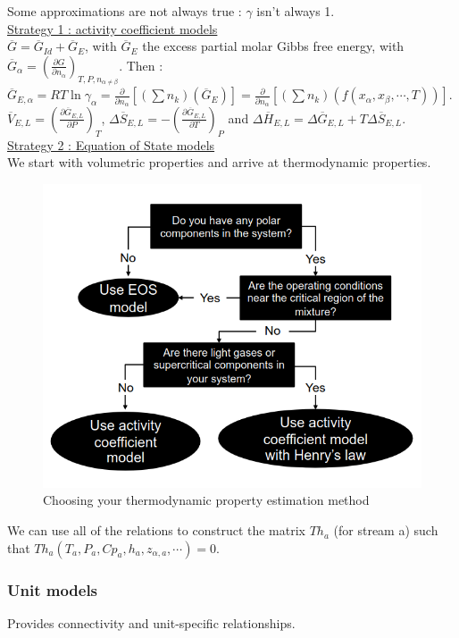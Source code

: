 \documentclass[../main.tex]{subfiles}
\begin{document}
\warning Some approximations are not always true : $\gamma$ isn't always 1.\\

\quad \underline{Strategy 1 : activity coefficient models}\\
$\overline{G} = \overline{G}_{Id} + \overline{G}_E$, with $\overline{G}_E$ the excess partial molar Gibbs free energy, with $\overline{G}_\alpha= (\frac{\partial G}{\partial n_\alpha})_{T,P,n_{\alpha \neq \beta}}$. Then : $\overline{G}_{E,\alpha} = RT \ln \gamma_\alpha = \frac{\partial}{\partial n_\alpha} [(\sum n_k)(\overline{G}_E)] =  \frac{\partial}{\partial n_\alpha} [(\sum n_k)(f(x_\alpha,x_\beta, \cdots, T))]$.\\
$\overline{V}_{E,L}=(\frac{\partial \overline{G}_{E,L}}{\partial P})_T$, $\Delta \overline{S}_{E,L}=-(\frac{\partial \overline{G}_{E,L}}{\partial T})_P$ and $\Delta \overline{H}_{E,L} = \Delta \overline{G}_{E,L} +T\Delta \overline{S}_{E,L}$.\\

\quad \underline{Strategy 2 : Equation of State models}\\
We start with volumetric properties and arrive at thermodynamic properties. \\
\begin{figure}[hbt!]
    \centering
    \includegraphics[width=0.5\linewidth]{IMAGES/ESE/Screenshot from 2025-03-25 16-00-17.png}
    \caption{Choosing your thermodynamic property estimation method}
\end{figure}

We can use all of the relations to construct the matrix $Th_a$ (for stream a) such that $Th_a(T_a, P_a, Cp_a, h_a, z_{\alpha,a},\cdots)=0$.

\subsubsection{Unit models}
Provides connectivity and unit-specific relationships.\\
\end{document}
